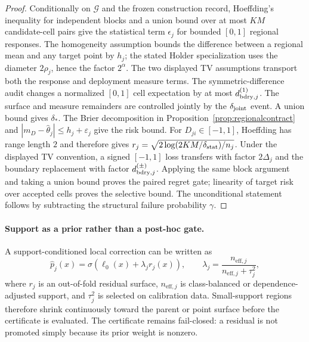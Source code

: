 \documentclass[11pt,a4paper]{article}
\numberwithin{equation}{section}
\theoremstyle{definition}\newtheorem{definition}[theorem]{Definition}
\theoremstyle{remark}\newtheorem{remark}[theorem]{Remark}
\begin{document}
\begin{proof}
Conditionally on $\mathcal G$ and the frozen construction record, Hoeffding's
inequality for independent blocks and a union bound over at most $KM$
candidate-cell pairs give the statistical term $\epsilon_j$ for bounded
$[0,1]$ regional responses. The homogeneity assumption bounds the difference
between a regional mean and any target point by $h_j$; the stated Holder
specialization uses the diameter $2\rho_j$, hence the factor $2^\alpha$.
The two displayed TV assumptions transport both the response and deployment
measure terms. The symmetric-difference audit changes a normalized
$[0,1]$ cell expectation by at most $d^{(1)}_{{\rm bdry},j}$. The surface and
measure remainders are controlled jointly by the $\delta_{\rm joint}$ event.
A union bound gives $\delta_*$. The Brier decomposition in
Proposition~\ref{prop:regionalcontract} and
$|m_D-\widehat\theta_j|\leq h_j+\varepsilon_j$ give the risk bound.
For $D_{ji}\in[-1,1]$, Hoeffding has range length $2$ and therefore gives
$r_j=\sqrt{2\log(2KM/\delta_{\rm stat})/n_j}$. Under the displayed TV
convention, a signed $[-1,1]$ loss transfers with factor $2\Delta_j$ and the
boundary replacement with factor $d^{(\pm)}_{{\rm bdry},j}$.
Applying the same block argument and taking a union bound proves the paired
regret gate; linearity of target risk over accepted cells proves the selective
bound. The unconditional statement follows by subtracting the structural
failure probability $\gamma$.
\end{proof}

\paragraph{Support as a prior rather than a post-hoc gate.}
A support-conditioned local correction can be written as
\[
 \widehat p_j(x)=\sigma\!\left(\ell_0(x)+\lambda_j r_j(x)\right),
 \qquad
 \lambda_j=\frac{n_{\mathrm{eff},j}}
 {n_{\mathrm{eff},j}+\tau_j^2},
\]
where $r_j$ is an out-of-fold residual surface, $n_{\mathrm{eff},j}$ is class-balanced or dependence-adjusted support, and $\tau_j^2$ is selected on calibration data. Small-support regions therefore shrink continuously toward the parent or point surface before the certificate is evaluated. The certificate remains fail-closed: a residual is not promoted simply because its prior weight is nonzero.
\end{document}
